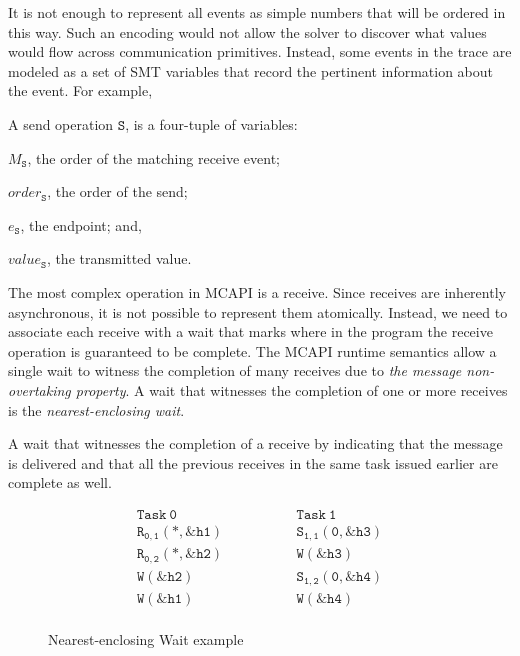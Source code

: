 It is not enough to represent all events as simple numbers
that will be ordered in this way.  Such an encoding would not allow the solver to
discover what values would flow across communication primitives. Instead, some events in the trace are modeled as a set of SMT
variables that record the pertinent information about the event. For
example,

\begin{definition}[Send] \label{def:snd}
A send operation $\mathtt{S}$, is a four-tuple of variables:
\begin{compactenum}
\item $M_\mathtt{S}$, the order of the matching receive event;

\item $\mathit{order}_\mathtt{S}$, the order of the send;

\item $e_\mathtt{S}$, the endpoint; and,

\item $\mathit{value}_\mathtt{S}$, the transmitted value.
\end{compactenum}
\end{definition}

The most complex operation in MCAPI is a receive. Since receives are
inherently asynchronous, it is not possible to represent them
atomically. Instead, we need to associate each receive with a wait
that marks where in the program the receive operation is guaranteed to be
complete. The MCAPI runtime semantics allow a single wait to witness the completion of many receives due to \emph{the message
  non-overtaking property}. A wait that witnesses the completion of
one or more receives is the \emph{nearest-enclosing wait}.

\begin{definition} \label{def:nw}
A wait that witnesses the completion of a receive by indicating that
the message is delivered and that all the previous receives in the
same task issued earlier are complete as well.
\end{definition}

\begin{figure}[h]
\[
\begin{array}{l|l}
\;\;\;\;\;\;\;\;\mathtt{Task\ 0}\;\;\;\;\;\;\;\; & \;\;\;\;\;\;\;\; \mathtt{Task\ 1}\;\;\;\;\;\;\;\; \\
\hline
\;\;\;\;\;\;\;\;\mathtt{R_{0,1}(*,\&h1)}\;\;\;\;\;\;\;\; & \;\;\;\;\;\;\;\; \mathtt{S_{1,1}(0,\&h3)}\;\;\;\;\;\;\;\; \\
\;\;\;\;\;\;\;\;\mathtt{R_{0,2}(*,\&h2)}\;\;\;\;\;\;\;\; & \;\;\;\;\;\;\;\; \mathtt{W{(\&h3)}}\;\;\;\;\;\;\;\; \\
\;\;\;\;\;\;\;\;\mathtt{W{(\&h2)}}\;\;\;\;\;\;\;\; & \;\;\;\;\;\;\;\; \mathtt{S_{1,2}(0,\&h4)}\;\;\;\;\;\;\;\; \\
\;\;\;\;\;\;\;\;\mathtt{W{(\&h1)}}\;\;\;\;\;\;\;\; & \;\;\;\;\;\;\;\; \mathtt{W{(\&h4)}}\;\;\;\;\;\;\;\; \\
\end{array}
\]
\caption{Nearest-enclosing Wait example} \label{fig:nw}
\end{figure}

